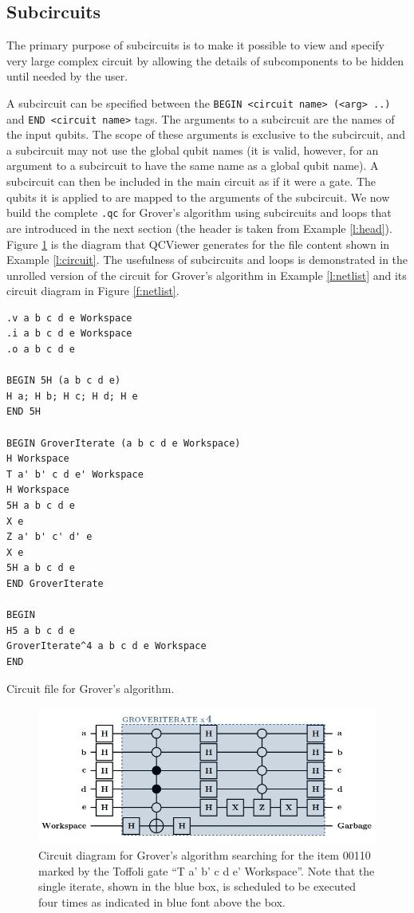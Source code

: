 \documentclass[aps,prl,reprint,floatfix,superscriptaddress]{revtex4-1} %
\begin{document}
\subsection{Subcircuits}
The primary purpose of subcircuits is to make it possible to view and specify very large complex circuit by allowing the details of 
subcomponents to be hidden until needed by the user.

A subcircuit can be specified between the \verb+BEGIN <circuit name> (<arg> ..)+ and \verb+END <circuit name>+ tags. The arguments to a subcircuit are the names of the input qubits. The scope of these arguments is exclusive to the subcircuit, and a subcircuit may not use the global qubit names (it is valid, however, for an argument to a subcircuit to have the same name as a global qubit name). A subcircuit can then be included
in the main circuit as if it were a gate. The qubits it is applied to are mapped to the arguments of the subcircuit. We now build the complete \verb+.qc+ for Grover's algorithm 
using subcircuits and loops that are introduced in the next section (the header is taken from Example \ref{l:head}). Figure \ref{f:grover} is the diagram that QCViewer generates for the file content shown in Example \ref{l:circuit}.  The usefulness of subcircuits and loops is demonstrated in the
unrolled version of the circuit for Grover's algorithm in Example \ref{l:netlist} and its circuit diagram in Figure \ref{f:netlist}.
\begin{program}
\begin{verbatim}
.v a b c d e Workspace
.i a b c d e Workspace
.o a b c d e

BEGIN 5H (a b c d e)
H a; H b; H c; H d; H e
END 5H

BEGIN GroverIterate (a b c d e Workspace)
H Workspace
T a' b' c d e' Workspace
H Workspace
5H a b c d e
X e
Z a' b' c' d' e
X e
5H a b c d e
END GroverIterate

BEGIN
H5 a b c d e
GroverIterate^4 a b c d e Workspace
END
\end{verbatim}
\caption{Circuit file for Grover's algorithm.}
\label{l:circuit}
\end{program}
\begin{figure}[p]
\includegraphics[scale=0.32]{grover_circuit}
\caption{Circuit diagram for Grover's algorithm searching for the item 00110 marked by the Toffoli gate 
``T a' b' c d e' Workspace''. Note that the single iterate, shown in the blue box, is scheduled to be 
executed four times as indicated in blue font above the box.}
\label{f:grover}
\end{figure}
\end{document}

